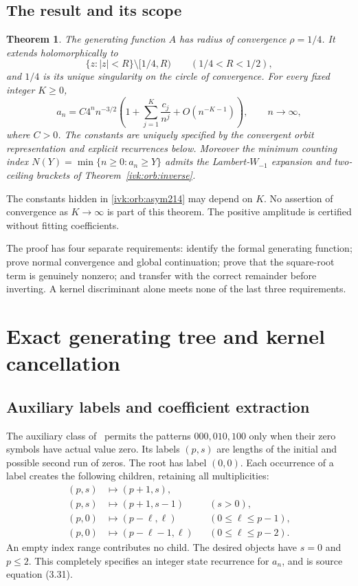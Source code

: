 \documentclass[11pt,letterpaper]{article}
\newtheorem{theorem}{Theorem}[section]
\theoremstyle{remark}\newtheorem{remark}[theorem]{Remark}
\begin{document}
\subsection{The result and its scope}
\begin{theorem}\label{ivk:orb:main214}
The generating function $A$ has radius of convergence $\rho=1/4$.
It extends holomorphically to
\begin{equation}\label{ivk:orb:slit214}
\{z:|z|<R\}\setminus[1/4,R)\qquad(1/4<R<1/2),
\end{equation}
and $1/4$ is its unique singularity on the circle of convergence.
For every fixed integer $K\ge0$,
\begin{equation}\label{ivk:orb:asym214}
a_n=C4^n n^{-3/2}\left(1+\sum_{j=1}^{K}\frac{c_j}{n^j}
+O(n^{-K-1})\right),\qquad n\longrightarrow\infty,
\end{equation}
where $C>0$. The constants are uniquely specified by the convergent
orbit representation and explicit recurrences below. Moreover the
minimum counting index $N(Y)=\min\{n\ge0:a_n\ge Y\}$ admits the
Lambert-$W_{-1}$ expansion and two-ceiling brackets of
Theorem~\ref{ivk:orb:inverse}.
\end{theorem}
The constants hidden in \eqref{ivk:orb:asym214} may depend on $K$.
No assertion of convergence as $K\to\infty$ is part of this theorem.
The positive amplitude is certified without fitting coefficients.

The proof has four separate requirements: identify the formal generating
function; prove normal convergence and global continuation; prove that
the square-root term is genuinely nonzero; and transfer with the correct
remainder before inverting. A kernel discriminant alone meets none of
the last three requirements.

\section{Exact generating tree and kernel cancellation}
\subsection{Auxiliary labels and coefficient extraction}
The auxiliary class of~\cite[Section 3.5]{bb} permits the patterns
$000,010,100$ only when their zero symbols have actual value zero.
Its labels $(p,s)$ are lengths of the initial and possible second run of
zeros. The root has label $(0,0)$. Each occurrence of a label creates the
following children, retaining all multiplicities:
\begin{equation}\label{ivk:orb:tree214}
\begin{aligned}
(p,s)&\longmapsto(p+1,s),\\
(p,s)&\longmapsto(p+1,s-1)&& (s>0),\\
(p,0)&\longmapsto(p-\ell,\ell)&& (0\le\ell\le p-1),\\
(p,0)&\longmapsto(p-\ell-1,\ell)&& (0\le\ell\le p-2).
\end{aligned}
\end{equation}
An empty index range contributes no child. The desired objects have
$s=0$ and $p\le2$. This completely specifies an integer state recurrence
for $a_n$, and is source equation (3.31).
\end{document}
